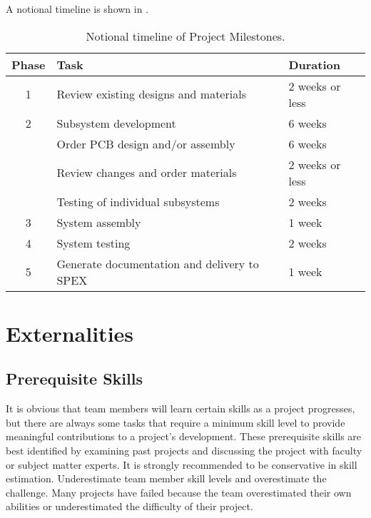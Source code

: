\documentclass[conference]{IEEEtran} %
\begin{document}
A notional timeline is shown in .

\begin{table}[hb!]
    \caption{Notional timeline of Project Milestones.}
    \centering
    \begin{tabular}{@{}cll@{}}
    \toprule
    Phase & Task & Duration \\
    \midrule
    1 & Review existing designs and materials & 2 weeks or less\\
    2 & Subsystem development & 6 weeks \\
      & Order PCB design and/or assembly & 6 weeks \\
      & Review changes and order materials & 2 weeks or less\\
      & Testing of individual subsystems & 2 weeks \\
    3 & System assembly & 1 week  \\
    4 & System testing & 2 weeks  \\
    5 & Generate documentation and delivery to SPEX & 1 week  \\
    \bottomrule
    \end{tabular}
\label{tab:short-example}
\end{table}

\section{Externalities}
\subsection{Prerequisite Skills}
It is obvious that team members will learn certain skills as a project progresses, but there are always some tasks that require a minimum skill level to provide meaningful contributions to a project's development.
These prerequisite skills are best identified by examining past projects and discussing the project with faculty or subject matter experts.
It is strongly recommended to be conservative in skill estimation.
Underestimate team member skill levels and overestimate the challenge.
Many projects have failed because the team overestimated their own abilities or underestimated the difficulty of their project.
\end{document}
